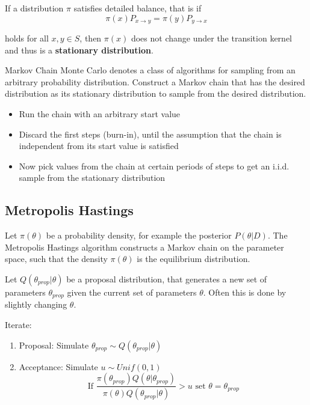 \documentclass[11pt]{article}
\begin{document}
If a distribution $\pi$ satisfies detailed balance, that is if
\begin{equation*}
	\pi(x)P_{x\rightarrow y} = \pi(y) P_{y\rightarrow x}
\end{equation*}

holds for all $x,y \in S$, then $\pi(x)$ does not change under the transition kernel and thus is a \textbf{stationary distribution}.

Markov Chain Monte Carlo denotes a class of algorithms for sampling from an arbitrary probability distribution. Construct a Markov chain that has the desired distribution as its stationary distribution to sample from the desired distribution.

\begin{itemize}
	\item Run the chain with an arbitrary start value
	\item Discard the first steps (burn-in), until the assumption that the chain is independent from its start value is satisfied
	\item Now pick values from the chain at certain periods of steps to get an i.i.d. sample from the stationary distribution
\end{itemize}

\subsection{Metropolis Hastings}

Let $\pi(\theta)$ be a probability density, for example the posterior $P(\theta|D)$. The Metropolis Hastings algorithm constructs a Markov chain on the parameter space, such that the density $\pi(\theta)$ is the equilibrium distribution.

Let $Q(\theta_{prop} |\theta)$ be a proposal distribution, that generates a new set of parameters $\theta_{prop}$ given the current set of parameters $\theta$. Often this is done by slightly changing $\theta$.

Iterate:
\begin{enumerate}
	\item Proposal: Simulate $\theta_{prop} \sim Q(\theta_{prop} |\theta)$
	\item Acceptance: Simulate $u \sim Unif(0,1)$\\
	$$\text{If }\frac{\pi(\theta_{prop})Q(\theta|\theta_{prop} )}{\pi(\theta) Q(\theta_{prop} |\theta)}> u\text{ set }\theta = \theta_{prop}$$
\end{enumerate}
\end{document}
